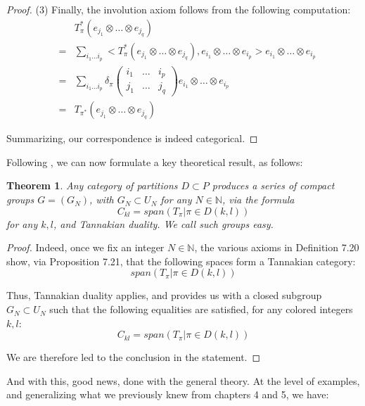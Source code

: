 \documentclass[12pt]{amsbook}
\newtheorem{theorem}{Theorem}[chapter]
\begin{document}
\begin{proof}
(3) Finally, the involution axiom follows from the following computation:
\begin{eqnarray*}
&&T_\pi^*(e_{j_1}\otimes\ldots\otimes e_{j_q})\\
&=&\sum_{i_1\ldots i_p}<T_\pi^*(e_{j_1}\otimes\ldots\otimes e_{j_q}),e_{i_1}\otimes\ldots\otimes e_{i_p}>e_{i_1}\otimes\ldots\otimes e_{i_p}\\
&=&\sum_{i_1\ldots i_p}\delta_\pi\begin{pmatrix}i_1&\ldots&i_p\\ j_1&\ldots& j_q\end{pmatrix}e_{i_1}\otimes\ldots\otimes e_{i_p}\\
&=&T_{\pi^*}(e_{j_1}\otimes\ldots\otimes e_{j_q})
\end{eqnarray*}

Summarizing, our correspondence is indeed categorical.
\end{proof}

Following \cite{bsp}, we can now formulate a key theoretical result, as follows:

\begin{theorem}
Any category of partitions $D\subset P$ produces a series of compact groups $G=(G_N)$, with $G_N\subset U_N$ for any $N\in\mathbb N$, via the formula
$$C_{kl}=span\left(T_\pi\Big|\pi\in D(k,l)\right)$$
for any $k,l$, and Tannakian duality. We call such groups easy.
\end{theorem}

\begin{proof}
Indeed, once we fix an integer $N\in\mathbb N$, the various axioms in Definition 7.20 show, via Proposition 7.21, that the following spaces form a Tannakian category:
$$span\left(T_\pi\Big|\pi\in D(k,l)\right)$$

Thus, Tannakian duality applies, and provides us with a closed subgroup $G_N\subset U_N$ such that the following equalities are satisfied, for any colored integers $k,l$:
$$C_{kl}=span\left(T_\pi\Big|\pi\in D(k,l)\right)$$

We are therefore led to the conclusion in the statement.
\end{proof}

And with this, good news, done with the general theory. At the level of examples, and generalizing what we previously knew from chapters 4 and 5, we have:
\end{document}
